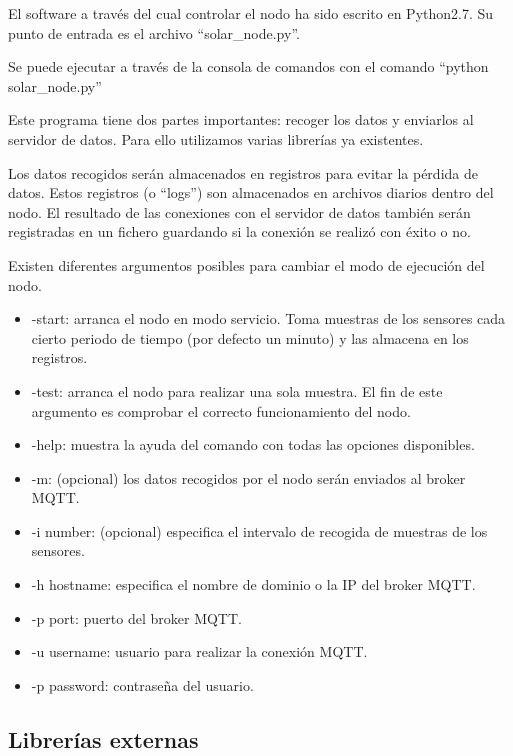El software a través del cual controlar el nodo ha sido escrito en Python2.7. Su punto de entrada es el archivo ``solar\_node.py''.

Se puede ejecutar a través de la consola de comandos con el comando ``python solar\_node.py''

Este programa tiene dos partes importantes: recoger los datos y enviarlos al servidor de datos. Para ello utilizamos varias librerías ya existentes.

Los datos recogidos serán almacenados en registros para evitar la pérdida de datos. Estos registros (o ``logs'') son almacenados en archivos diarios dentro del nodo. El resultado de las conexiones con el servidor de datos también serán registradas en un fichero guardando si la conexión se realizó con éxito o no.

Existen diferentes argumentos posibles para cambiar el modo de ejecución del nodo.
\begin{itemize}
\item -start: arranca el nodo en modo servicio. Toma muestras de los sensores cada cierto periodo de tiempo (por defecto un minuto) y las almacena en los registros.
\item -test: arranca el nodo para realizar una sola muestra. El fin de este argumento es comprobar el correcto funcionamiento del nodo.
\item -help: muestra la ayuda del comando con todas las opciones disponibles.
\item -m: (opcional) los datos recogidos por el nodo serán enviados al broker MQTT.
\item -i number: (opcional) especifica el intervalo de recogida de muestras de los sensores.
\item -h hostname: especifica el nombre de dominio o la IP del broker MQTT.
\item -p port: puerto del broker MQTT.
\item -u username: usuario para realizar la conexión MQTT.
\item -p password: contraseña del usuario. 
\end{itemize}

\subsection{Librerías externas}

